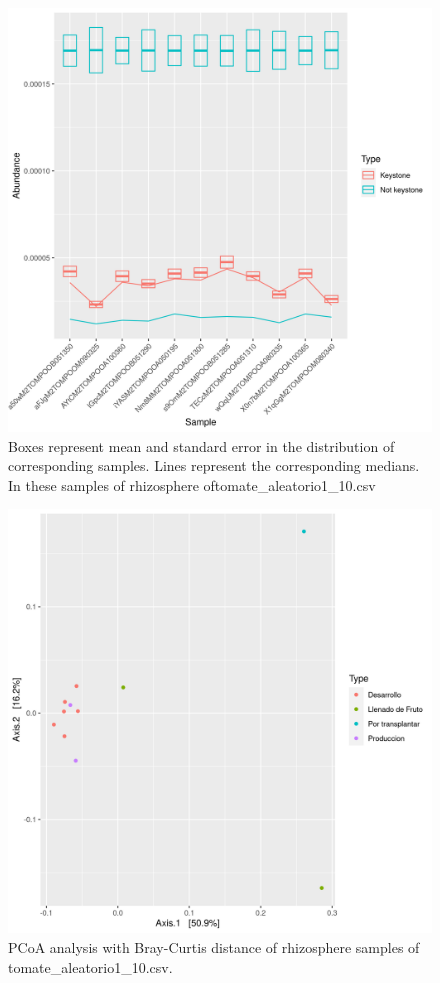 \begin{figure}
 \centering
 \includegraphics[scale = 0.75]{mean_median_key_vs_not_key_tomate_aleatorio1_10.csv.png}
\caption{Boxes represent mean and standard error in the distribution of corresponding samples. Lines represent the corresponding medians. In these samples of rhizosphere oftomate_aleatorio1_10.csv}
\label{mean_median_tomate_aleatorio1_10.csv}
\end{figure}
\begin{figure}
   \centering
   \includegraphics[scale = 0.7]{pcoa_muestras_tomate_aleatorio1_10.csv.png}
 \caption{PCoA analysis with Bray-Curtis distance of rhizosphere samples of tomate_aleatorio1_10.csv.}
 \label{fig:tomate_aleatorio1_10.csv_pcoa}
\end{figure}

